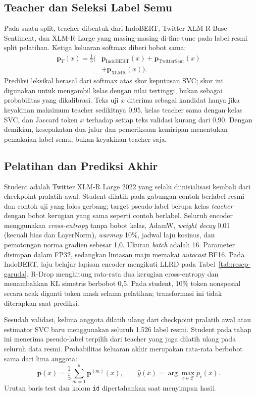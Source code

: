\subsection{Teacher dan Seleksi Label Semu}
Pada suatu split, teacher dibentuk dari IndoBERT, Twitter XLM-R Base Sentiment,
dan XLM-R Large yang masing-masing di-fine-tune pada label resmi split
pelatihan. Ketiga keluaran softmax diberi bobot sama:
\begin{equation}
\begin{aligned}
\mathbf{p}_{T}(x)=\frac{1}{3}\bigl(&\mathbf{p}_{\mathrm{IndoBERT}}(x)+
\mathbf{p}_{\mathrm{TwitterSent}}(x)\\
&+\mathbf{p}_{\mathrm{XLMR}}(x)\bigr).
\end{aligned}
\end{equation}
Prediksi leksikal berasal dari softmax atas skor keputusan SVC; skor ini
digunakan untuk mengambil kelas dengan nilai tertinggi, bukan sebagai
probabilitas yang dikalibrasi. Teks uji $x$ diterima sebagai kandidat hanya
jika keyakinan maksimum teacher sedikitnya 0,95, kelas teacher sama dengan
kelas SVC, dan Jaccard token $x$ terhadap setiap teks validasi kurang dari
0,90. Dengan demikian, kesepakatan dua jalur dan pemeriksaan kemiripan
menentukan pemakaian label semu, bukan keyakinan teacher saja.

\subsection{Pelatihan dan Prediksi Akhir}
Student adalah Twitter XLM-R Large 2022 yang selalu diinisialisasi kembali
dari checkpoint pralatih awal. Student dilatih pada gabungan contoh berlabel
resmi dan contoh uji yang lolos gerbang; target pseudo-label berupa kelas
\textit{teacher} dengan bobot kerugian yang sama seperti contoh berlabel.
Seluruh encoder menggunakan \textit{cross-entropy} tanpa bobot kelas, AdamW,
\textit{weight decay} 0,01 (kecuali bias dan LayerNorm), \textit{warmup}
10\%, jadwal laju kosinus, dan pemotongan norma gradien sebesar 1,0. Ukuran
\textit{batch} adalah 16. Parameter disimpan dalam FP32, sedangkan lintasan
maju memakai \textit{autocast} BF16. Pada IndoBERT, laju belajar lapisan
encoder mengikuti LLRD pada Tabel~\ref{tab:resep-garuda}. R-Drop menghitung
rata-rata dua kerugian cross-entropy dan menambahkan KL simetris berbobot
0,5. Pada student, 10\% token nonspesial secara acak diganti token mask
selama pelatihan; transformasi ini tidak diterapkan saat prediksi.

Sesudah validasi, kelima anggota dilatih ulang dari checkpoint pralatih awal
atau estimator SVC baru menggunakan seluruh 1.526 label resmi. Student pada
tahap ini menerima pseudo-label terpilih dari teacher yang juga dilatih ulang
pada seluruh data resmi. Probabilitas keluaran akhir merupakan rata-rata
berbobot sama dari lima anggota:
\begin{equation}
\bar{\mathbf{p}}(x)=\frac{1}{5}\sum_{m=1}^{5}\mathbf{p}^{(m)}(x),
\qquad \hat{y}(x)=\arg\max_{c\in\mathcal{C}}\bar{p}_{c}(x).
\end{equation}
Urutan baris test dan kolom \texttt{id} dipertahankan saat menyimpan hasil.

